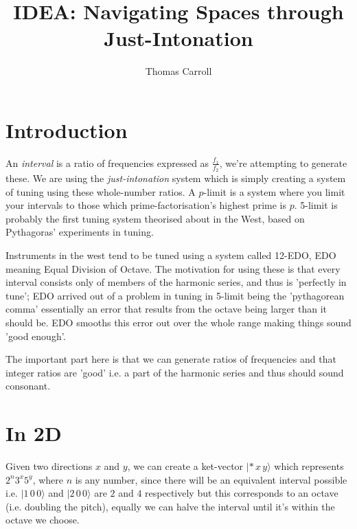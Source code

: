 \documentclass[10pt,a4paper]{article}
\title{IDEA: Navigating Spaces through Just-Intonation}
\date{}
\author{Thomas Carroll}
\begin{document}
\maketitle
\section{Introduction}
An \emph{interval} is a ratio of frequencies expressed as $\frac{f_1}{f_2}$, we're attempting to
generate these. We are using the \emph{just-intonation} system which is simply creating a system of
tuning using these whole-number ratios. A $p$-limit is a system where you limit your intervals to
those which prime-factorisation's highest prime is $p$. 5-limit is probably the first tuning system
theorised about in the West, based on Pythagoras' experiments in tuning.

Instruments in the west tend to be tuned using a system called 12-EDO, EDO meaning Equal Division of
Octave. The motivation for using these is that every interval consists only of members of the
harmonic series, and thus is 'perfectly in tune'; EDO arrived out of a problem in tuning in 5-limit
being the 'pythagorean comma' essentially an error that results from the octave being larger than it
should be. EDO smooths this error out over the whole range making things sound 'good enough'.

The important part here is that we can generate ratios of frequencies and that integer
ratios are 'good' i.e. a part of the harmonic series and thus should sound consonant.

\section{In 2D}

\begin{center}
\end{center}

Given two directions $x$ and $y$, we can create a ket-vector $|*\, x\, y \rangle$ which represents
$2^n 3^x 5^y$, where $n$ is any number, since there will be an equivalent interval possible i.e.
$|1\, 0\, 0\rangle$ and $|2\, 0\, 0\rangle$ are $2$ and $4$ respectively but this corresponds to an
octave (i.e. doubling the pitch), equally we can halve the interval until it's within the octave we
choose. 
\end{document}
